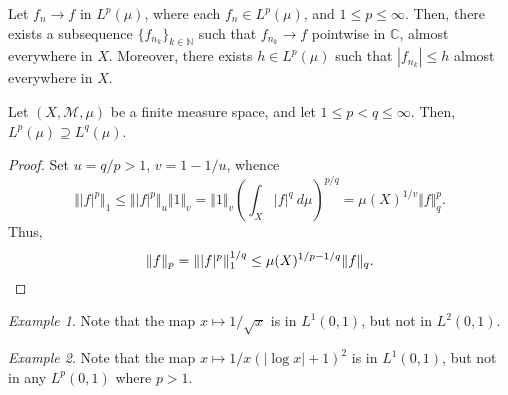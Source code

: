 \documentclass[11pt]{article}
\newcommand{\C}{\mathbb{C}}
\newcommand{\N}{\mathbb{N}}
\newcommand{\M}{\mathcal{M}}
\newcommand{\norm}[1]{\Vert #1 \Vert}
\theoremstyle{definition}
\theoremstyle{remark}
\newtheorem*{example}{Example}
\numberwithin{equation}{section}
\begin{document}
    \begin{corollary}
        Let $f_n \to f$ in $L^p(\mu)$, where each $f_n \in L^p(\mu)$, and $1 \leq p
        \leq \infty$. Then, there exists a subsequence $\{f_{n_k}\}_{k \in \N}$ such
        that $f_{n_k} \to f$ pointwise in $\C$, almost everywhere in $X$. Moreover,
        there exists $h \in L^p(\mu)$ such that $|f_{n_k}| \leq h$ almost everywhere
        in $X$.
    \end{corollary}

    \begin{theorem}
        Let $(X, \M, \mu)$ be a finite measure space, and let $1 \leq p < q \leq
        \infty$. Then, $L^p(\mu) \supseteq L^q(\mu)$.
    \end{theorem}
    \begin{proof}
        Set $u = q / p > 1$, $v = 1 - 1 / u$, whence \[
            \norm{|f|^p}_1 \leq \norm{|f|^p}_u\norm{1}_v = \norm{1}_v\left(\int_X
            |f|^q\:d\mu\right)^{p / q} = \mu(X)^{1 / v} \norm{f}_q^p.
        \] Thus, \[
            \norm{f}_p = \norm{|f|^p}_1^{1 / q} \leq \mu(X)^{1 / p - 1 /
            q}\norm{f}_q. \qedhere
        \]
    \end{proof}
    \begin{example}
        Note that the map $x \mapsto 1 / \sqrt{x}$ is in $L^1(0, 1)$, but not in
        $L^2(0, 1)$.
    \end{example}
    \begin{example}
        Note that the map $x \mapsto 1 / x(|\log{x}| + 1)^2$ is in $L^1(0, 1)$, but
        not in any $L^p(0, 1)$ where $p > 1$.
    \end{example}
\end{document}
